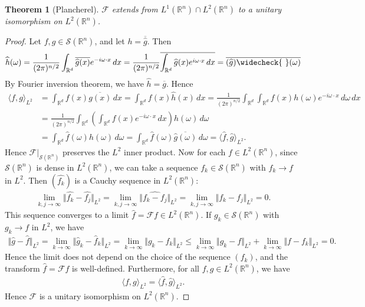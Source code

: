 \documentclass{article}
\numberwithin{equation}{section}
\newcommand{\bbR}{\mathbb{R}}
\renewcommand{\cal}{\mathcal}
\newcommand{\ol}{\overline}
\newcommand{\wh}{\widehat}
\theoremstyle{plain}
\newtheorem{theorem}{Theorem}[section]
\theoremstyle{definition}
\begin{document}
\begin{theorem}[Plancherel]\label{plancherel}
$\cal{F}$ extends from $L^1(\bbR^n)\cap L^2(\bbR^n)$ to a unitary isomorphism on $L^2(\bbR^n)$.
\end{theorem}
\begin{proof}
Let $f,g\in\cal{S}(\bbR^n)$, and let $h=\ol{\wh{g}}$. Then
\begin{align*}
	\wh{h}(\omega)=\frac{1}{(2\pi)^{n/2}}\int_{\bbR^d}\ol{\wh{g}(x)}e^{-i\omega\cdot x}\,dx=\frac{1}{(2\pi)^{n/2}}\ol{\int_{\bbR^d}\wh{g}(x)e^{i\omega\cdot x}\,dx}=\ol{(\wh g)\widecheck{\ }(\omega)}
\end{align*}
By Fourier inversion theorem, we have $\wh{h}=\ol{g}$. Hence
\begin{align*}
	\langle f,g\rangle_{L^2}&=\int_{\bbR^d}f(x)\ol{g(x)}\,dx=\int_{\bbR^d} f(x)\wh{h}(x)\,dx=\frac{1}{(2\pi)^{n/2}}\int_{\bbR^d}\int_{\bbR^d} f(x)h(\omega)e^{-i\omega\cdot x}\,d\omega\,dx\\
	&=\frac{1}{(2\pi)^{n/2}}\int_{\bbR^d}\left(\int_{\bbR^d} f(x)e^{-i\omega\cdot x}\,dx\right)h(\omega)\,d\omega\tag{By Fubini's theorem}\\
	&=\int_{\bbR^d}\wh{f}(\omega)h(\omega)\,d\omega=\int_{\bbR^d}\wh{f}(\omega)\ol{\wh{g}(\omega)}\,d\omega=\langle\wh{f},\wh{g}\rangle_{L^2}.
\end{align*}
Hence $\cal{F}|_{\cal{S}(\bbR^n)}$ preserves the $L^2$ inner product. Now for each $f\in L^2(\bbR^n)$, since $\cal{S}(\bbR^n)$ is dense in $L^2(\bbR^n)$, we can take a sequence $f_k\in\cal{S}(\bbR^n)$ with $f_k\to f$ in $L^2$. Then $(\wh{f_k})$ is a Cauchy sequence in $L^2(\bbR^n)$:
\begin{align*}
	\lim_{k,j\to\infty}\Vert\wh{f_k}-\wh{f_j}\Vert_{L^2}= \lim_{k,j\to\infty}\Vert \wh{f_k-f_j}\Vert_{L^2}=\lim_{k,j\to\infty}\Vert f_k-f_j\Vert_{L^2} =0.
\end{align*}
This sequence converges to a limit $\wh{f}=\cal{F}f\in L^2(\bbR^n)$. If $g_k\in\cal{S}(\bbR^n)$ with $g_k\to f$ in $L^2$, we have
\begin{align*}
	\Vert\wh{g}-\wh{f}\Vert_{L^2}=\lim_{k\to\infty}\Vert\wh{g}_k-\wh{f}_k\Vert_{L^2}=\lim_{k\to\infty}\Vert g_k-f_k\Vert_{L^2}\leq\lim_{k\to\infty}\Vert g_k-f\Vert_{L^2}+\lim_{k\to\infty}\Vert f-f_k\Vert_{L^2}=0.
\end{align*} 
Hence the limit does not depend on the choice of the sequence $(f_k)$, and the transform $\wh{f}=\cal{F}f$ is well-defined. Furthermore, for all $f,g\in L^2(\bbR^n)$, we have
\begin{align*}
	\langle f,g\rangle_{L^2}=\langle\wh{f},\wh{g}\rangle_{L^2}.
\end{align*}
Hence $\cal{F}$ is a unitary isomorphism on $L^2(\bbR^n)$.
\end{proof}
\end{document}
